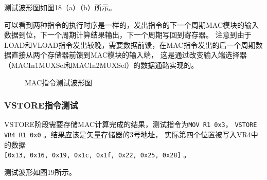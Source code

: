 \documentclass[UTF8]{ctexart}
\begin{document}
测试波形图如图18（a）（b）所示。

可以看到两种指令的执行时序是一样的，发出指令的下一个周期MAC模块的输入数据到位，下一个周期计算结果输出，下一个周期写回到寄存器。
注意到由于LOAD和VLOAD指令发出较晚，需要数据前馈，在MAC指令发出的后一个周期数据直接从两个存储器前馈到MAC模块的输入端，
这是通过改变输入端选择器（MACIn1MUXSel和MACIn2MUXSel）的数据通路实现的。

\begin{figure}[htbp]
    \centering
    \caption{MAC指令测试波形图}
    \label{Fig.main}
\end{figure}

\subsubsection{VSTORE指令测试}

VSTORE阶段需要存储MAC计算完成的结果，测试指令为\verb|MOV R1 0x3|， \verb|VSTORE VR4 R1 0x0| 。结果应该是矢量存储器的3号地址，
实际第四个位置被写入VR4中的数据\\\verb|[0x13, 0x16, 0x19, 0x1c, 0x1f, 0x22, 0x25, 0x28]| 。

测试波形如图19所示。
\end{document}
